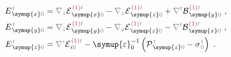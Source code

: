 \begin{subequations} \label{eq:E_0}
\begin{align}
	E^{\;\!\mathcolor{gray}{t}}_{\;\! \symup{x}\mathcolor{gray}{0}} &= \mathcolor{gray}{\nabla_z}
	{\mathcal{E}}^{\;\!\textcolor{Maroon}{(1)}\mathcolor{gray}{t}}_{\;\! \symup{x} \mathcolor{gray}{0}} - \mathcolor{gray}{\nabla_x}
	{\mathcal{E}}^{\;\!\textcolor{Maroon}{(1)}\mathcolor{gray}{t}}_{\;\! \symup{z} \mathcolor{gray}{0}} + \mathcolor{gray}{\nabla^t}
	{\mathcal{B}}^{\;\!\textcolor{Maroon}{(1)}\mathcolor{gray}{t}}_{\;\! \symup{y} \mathcolor{gray}{0}}~, \label{eq:E_x0} \\
	E^{\;\!\mathcolor{gray}{t}}_{\;\! \symup{y}\mathcolor{gray}{0}} &= \mathcolor{gray}{\nabla_z}
	{\mathcal{E}}^{\;\!\textcolor{Maroon}{(1)}\mathcolor{gray}{t}}_{\;\! \symup{y} \mathcolor{gray}{0}} - \mathcolor{gray}{\nabla_y}
	{\mathcal{E}}^{\;\!\textcolor{Maroon}{(1)}\mathcolor{gray}{t}}_{\;\! \symup{z} \mathcolor{gray}{0}} - \mathcolor{gray}{\nabla^t}
	{\mathcal{B}}^{\;\!\textcolor{Maroon}{(1)}\mathcolor{gray}{t}}_{\;\! \symup{x} \mathcolor{gray}{0}}~, \label{eq:E_y0} \\
	E^{\;\!\mathcolor{gray}{t}}_{\;\! \symup{z} \mathcolor{gray}{0}} &= \mathcolor{gray}{\nabla^i} 
	{\mathcal{E}}^{\;\!\textcolor{Maroon}{(1)}\mathcolor{gray}{t}}_{\;\! i \mathcolor{gray}{0}} - {\symup{\varepsilon}}_0^{-1} \left( {\mathcal{P}}^{\;\!\mathcolor{gray}{t}}_{\;\! \symup{z} \mathcolor{gray}{0}} - {\sigma}^{\;\!\mathcolor{gray}{t}}_{\;\! \mathcolor{gray}{0}} \right)~. \label{eq:E_z0}
\end{align}
\end{subequations}


